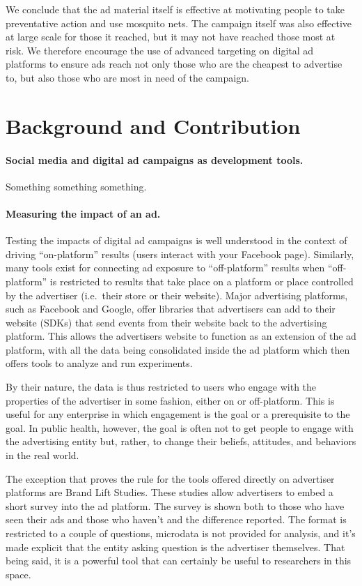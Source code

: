 \documentclass[a4paper,12pt]{article}
\theoremstyle{proposition}
\begin{document}
We conclude that the ad material itself is effective at motivating people to take preventative action and use mosquito nets. The campaign itself was also effective at large scale for those it reached, but it may not have reached those most at risk. We therefore encourage the use of advanced targeting on digital ad platforms to ensure ads reach not only those who are the cheapest to advertise to, but also those who are most in need of the campaign.


\section{Background and Contribution}

\paragraph{Social media and digital ad campaigns as development tools.} Something something something.


\paragraph{Measuring the impact of an ad.} Testing the impacts of digital ad campaigns is well understood in the context of driving ``on-platform'' results (users interact with your Facebook page). Similarly, many tools exist for connecting ad exposure to ``off-platform'' results when ``off-platform'' is restricted to results that take place on a platform or place controlled by the advertiser (i.e.\ their store or their website). Major advertising platforms, such as Facebook and Google, offer libraries that advertisers can add to their website (SDKs) that send events from their website back to the advertising platform. This allows the advertisers website to function as an extension of the ad platform, with all the data being consolidated inside the ad platform which then offers tools to analyze and run experiments.

By their nature, the data is thus restricted to users who engage with the properties of the advertiser in some fashion, either on or off-platform. This is useful for any enterprise in which engagement is the goal or a prerequisite to the goal. In public health, however, the goal is often not to get people to engage with the advertising entity but, rather, to change their beliefs, attitudes, and behaviors in the real world.

The exception that proves the rule for the tools offered directly on advertiser platforms are Brand Lift Studies. These studies allow advertisers to embed a short survey into the ad platform. The survey is shown both to those who have seen their ads and those who haven't and the difference reported. The format is restricted to a couple of questions, microdata is not provided for analysis, and it's made explicit that the entity asking question is the advertiser themselves. That being said, it is a powerful tool that can certainly be useful to researchers in this space.
\end{document}
